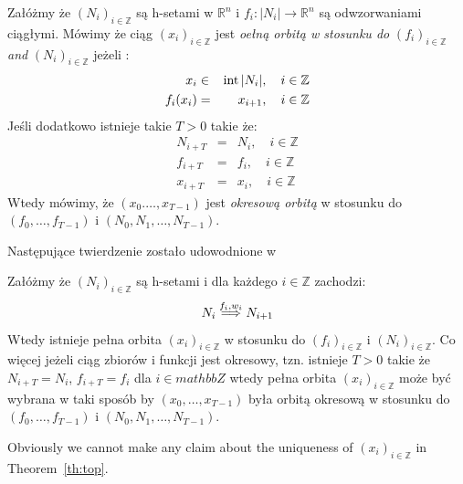 \begin{definition}\label{def:orbitWithRespectTo}
Załóżmy że $(N_i)_{i\in\mathbb Z}$ są h-setami w $\mathbb R^n$ i
$f_i:|N_i|\to\mathbb R^n$ są odwzorwaniami ciągłymi. Mówimy że ciąg 
$(x_i)_{i\in\mathbb Z}$ jest \emph{oełną orbitą w stosunku do }
$(f_i)_{i\in\mathbb Z}$ \emph{and} $(N_i)_{i\in\mathbb Z}$ jeżeli :
\begin{eqnarray*}
    x_i &\in &{\rm int}\, |N_i|,\quad i\in\mathbb Z\\
   f_{i}(x_i)&=&x_{i+1},\quad i\in\mathbb Z
\end{eqnarray*}
Jeśli dodatkowo istnieje takie $T>0$ takie że:
\begin{eqnarray*}
    N_{i+T}&=&N_i,\quad i\in\mathbb Z\\
    f_{i+T}&=&f_i,\quad i\in\mathbb Z\\
    x_{i+T}&=&x_i,\quad i\in\mathbb Z
\end{eqnarray*}
Wtedy mówimy, że $(x_0. \ldots, x_{T-1})$ jest \emph{okresową orbitą}
w stosunku do $(f_0,\ldots, f_{T-1})$ i $(N_0,N_1,\ldots,N_{T-1})$.
\end{definition}

Następujące twierdzenie zostało udowodnione w \cite{ZGi}
\begin{theorem} \cite[Theorem 9]{ZGi}
\label{th:top}
Załóżmy że $(N_i)_{i\in\mathbb Z}$ są h-setami i dla każdego $i \in \mathbb Z$ zachodzi:
\begin{equation*}
  N_{i} \stackrel{f_i,w_i}{\Longrightarrow} N_{i+1}
\end{equation*}
Wtedy istnieje pełna orbita $(x_i)_{i \in \mathbb Z }$ w stosunku do 
$(f_i)_{i\in\mathbb Z}$ i $(N_i)_{i\in\mathbb Z}$. Co więcej jeżeli 
ciąg zbiorów i funkcji jest okresowy, tzn. istnieje $T>0$ takie że 
$N_{i+T} = N_i$, $f_{i+T} = f_i$ dla $i \in mathbb Z$ wtedy pełna orbita 
$(x_i)_{i\in\mathbb Z}$ może być wybrana w taki sposób by $(x_0,\ldots,x_{T-1})$
była orbitą okresową w stosunku do $(f_0,\ldots,f_{T-1})$ i $(N_0,N_1,\ldots,N_{T-1})$.
\end{theorem}

Obviously we cannot make any claim about the uniqueness of
$(x_i)_{i\in\mathbb Z}$ in Theorem~\ref{th:top}.